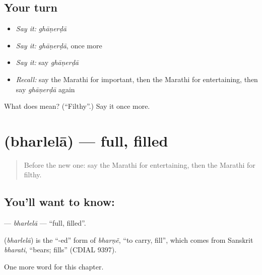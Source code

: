 \subsection*{Your turn}
\begin{itemize}
\raggedright
  \item \emph{Say it:} \emph{ghāṇerḍā}
  \item \emph{Say it:} \emph{ghāṇerḍā}, once more
  \item \emph{Say it:} say \emph{ghāṇerḍā}
  \item \emph{Recall:} say the Marathi for important, then the Marathi for entertaining, then say \emph{ghāṇerḍā} again
\end{itemize}

\begin{tcolorbox}[breakable,colback=teal!4,colframe=teal!35!black,title={Before you move on}]
What does  mean? (\textquotedblleft{}Filthy\textquotedblright{}.) Say it once more.
\end{tcolorbox}
\section[\texorpdfstring{\mr{भरलेला} (bharlelā)}{भरलेला (bharlelā)}]{ (bharlelā) — full, filled}

\label{lesson:MR-C234-bharlela}



\begin{quote}
Before the new one: say the Marathi for entertaining, then the Marathi for filthy.
\end{quote}

\subsection*{You'll want to know: }
\textbf{} — \emph{bharlelā} — \textquotedblleft{}full, filled\textquotedblright{}.

\begin{cousinweb}
\textbf{} (\emph{bharlelā}) is the \textquotedblleft{}-ed\textquotedblright{} form of \emph{bharṇẽ}, \textquotedblleft{}to carry, fill\textquotedblright{}, which comes from Sanskrit \emph{bharati}, \textquotedblleft{}bears; fills\textquotedblright{} (CDIAL 9397).
\end{cousinweb}

\begin{grammarlens}[title={What you've built}]
One more word for this chapter.
\end{grammarlens}

